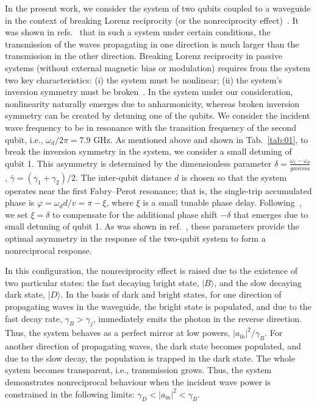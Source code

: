 \documentclass[lettersize,journal]{IEEEtran}
\begin{document}
In the present work, we consider the system of two qubits coupled to a waveguide in the context of breaking Lorenz reciprocity (or the nonreciprocity effect)~\cite{}.
It was shown in refs.~\cite{dai_rectification_2015,muller_nonreciprocal_2017,rosario_hamann_nonreciprocity_2018, Nefedkin2022} that in such a system under certain conditions, the transmission of the waves propagating in one direction is much larger than the transmission in the other direction.
Breaking Lorenz reciprocity in passive systems (without external magnetic bias or modulation) requires from the system two key characteristics: (i) the system must be nonlinear; (ii) the system's inversion symmetry must be broken~\cite{}.
In the system under our consideration, nonlinearity naturally emerges due to anharmonicity, whereas broken inversion symmetry can be created by detuning one of the qubits.
We consider the incident wave frequency to be in resonance with the transition frequency of the second qubit, i.e., $\omega_d / 2\pi = 7.9$ GHz.
As mentioned above and shown in Tab.~\ref{tab:01}, to break the inversion symmetry in the system, we consider a small detuning of qubit 1.
This asymmetry is determined by the dimensionless parameter $\delta = \frac{\omega_1 - \omega_d}{\bar{gamma}}$, $\bar{\gamma} = (\gamma_1 + \gamma_2) / 2$.
The inter-qubit distance $d$ is chosen so that the system operates near the first Fabry–Perot resonance; that is, the single-trip accumulated phase is $\varphi = \omega_d d / v = \pi - \xi$, where $\xi$ is a small tunable phase delay. 
Following~\cite{dai_rectification_2015,muller_nonreciprocal_2017}, we set $\xi = \delta$ to compensate for the additional phase shift $-\delta$ that emerges due to small detuning of qubit 1. 
As was shown in ref.~\cite{muller_nonreciprocal_2017}, these parameters provide the optimal asymmetry in the response of the two-qubit system to form a nonreciprocal response.

In this configuration, the nonreciprocity effect is raised due to the existence of two particular states: the fast decaying bright state, $|B\rangle$, and the slow decaying dark state, $|D\rangle$.
In the basis of dark and bright states, for one direction of propagating waves in the waveguide, the bright state is populated, and due to the fast decay rate, $\gamma_B > \gamma_j$, immediately emits the photon in the reverse direction. 
Thus, the system behaves as a perfect mirror at low powers, $|a_\mathrm{in}|^2 / \gamma_B$.
For another direction of propagating waves, the dark state becomes populated, and due to the slow decay, the population is trapped in the dark state. 
The whole system becomes transparent, i.e., transmission grows.
Thus, the system demonstrates nonreciprocal behaviour when the incident wave power is constrained in the following limits: $ \gamma_D < |a_\mathrm{in}|^2 < \gamma_B$.
\end{document}

